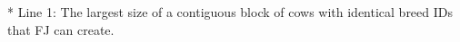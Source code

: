 * Line 1: The largest size of a contiguous block of cows with identical breed IDs that FJ can create.